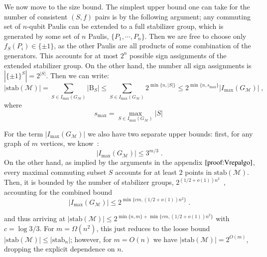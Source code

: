 \documentclass[10pt,aps,pra,twocolumn,floatfix,nofootinbib,superscriptaddress,longbibliography]{revtex4-2}
\newcommand{\1}{\mathbbm{1}}
\begin{document}
We now move to the size bound. The simplest upper bound one can take for the number of consistent $(S,f)$ pairs is by the following argument; any commuting set of $n$-qubit Paulis can be extended to a full stabilizer group, which is generated by some set of $n$ Paulis, $\{P_1,\cdots,P_n\}$. Then we are free to choose only $f_S(P_i)\in\{\pm1\}$, as the other Paulis are all products of some combination of the generators. This accounts for at most $2^n$ possible sign assignments of the extended stabilizer group. On the other hand, the number all sign assignments is $|\{\pm1\}^S|=2^{|S|}$. Then we can write:
\begin{equation}
    |\mathrm{stab}(\mathcal M)| =\sum_{S \in I_\mathrm{max}(G_\mathcal M)}|\mathrm B_S| \leq \sum_{S \in I_\mathrm{max}(G_\mathcal M)}2^{\min\{n,|S|\}}\leq 2^{\min\{n,s_{\mathrm{max}}\}}|I_\mathrm{max}(G_\mathcal M)| \;,
    \label{eq:sizebound}
\end{equation}
where 
\begin{equation}
    s_\mathrm{max} = \max_{S \in I_\mathrm{max}(G_\mathcal M)}|S|\;
    \label{eq:Ssize}
\end{equation}

For the term $|I_\mathrm{max}(G_\mathcal M)|$ we also have two separate upper bounds: first, for any graph of $m$ vertices, we know~\cite{moon1965cliques}:
\begin{equation}
    |I_\mathrm{max}(G_\mathcal M)|\leq 3^{m/3}\;.
\end{equation}
On the other hand, as implied by the arguments in the appendix $\ref{proof:Vrepalgo}$, every maximal commuting subset $S$ accounts for at least $2$ points in $\mathrm{stab}(\mathcal M)$. Then, it is bounded by the number of stabilizer groups, $2^{(1/2+o(1))n^2}$~\cite{aaronson2004improved}, accounting for the combined bound
\begin{equation}
    |I_\mathrm{max}(G_\mathcal M)|\leq 2^{\min\{cm,(1/2+o(1))n^2\}}\;.
    \label{eq:maxindepsetsize}
\end{equation}


and thus arriving at $|\mathrm{stab}(\mathcal M)| \leq 2^{\min\{n,m\}+\min\{cm,(1/2+o(1))n^2\}}$ with $c=\log 3/3$. For $m=\Omega(n^2)$, this just reduces to the loose bound $|\mathrm{stab}(\mathcal M)| \leq |\mathrm{stab}_n|$; however, for $m=O(n)$ we have $|\mathrm{stab}(\mathcal M)| = 2^{O(m)}$, dropping the explicit dependence on $n$.

\end{document}
